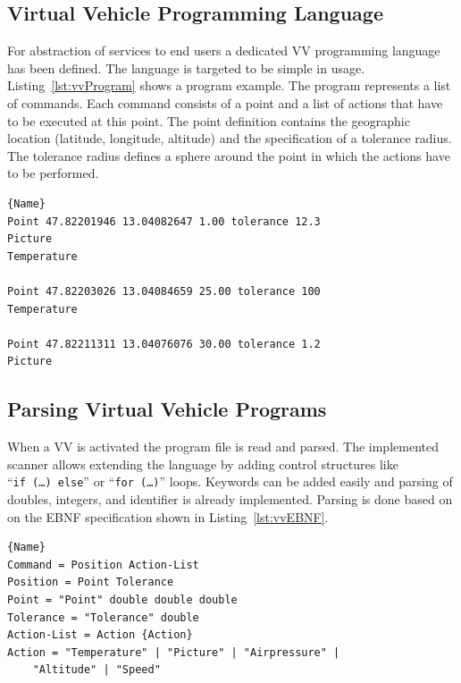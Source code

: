 \subsection{Virtual Vehicle Programming Language}

For abstraction of services to end users a dedicated \ac{VV} programming language has been defined. The language
is targeted to be simple in usage. Listing~\ref{lst:vvProgram} shows a program example. The program represents a
list of commands. Each command consists of a point and a list of actions that have to be executed at this point. The
point definition contains the geographic location (latitude, longitude, altitude) and the specification of a tolerance
radius. The tolerance radius defines a sphere around the point in which the actions have to be performed.

\lstset{tabsize=3,language=Tex}
\begin{lstlisting}[caption={Virtual Vehicle Sample Program},mathescape=true,label=lst:vvProgram]{Name}
Point 47.82201946 13.04082647 1.00 tolerance 12.3
Picture
Temperature

Point 47.82203026 13.04084659 25.00 tolerance 100
Temperature

Point 47.82211311 13.04076076 30.00 tolerance 1.2
Picture
\end{lstlisting}

\subsection{Parsing Virtual Vehicle Programs}
When a \ac{VV} is activated the program file is read and parsed. The implemented scanner allows extending the 
language by adding control structures like ``\texttt{if~(\ldots)~else}'' or ``\texttt{for~(\ldots)}'' loops. Keywords
can be added easily and parsing of doubles, integers, and identifier is already implemented. 
%
Parsing is done based on on the EBNF specification shown in Listing~\ref{lst:vvEBNF}.

\lstset{tabsize=3,language=Tex}
\begin{lstlisting}[caption={Virtual Vehicle EBNF},mathescape=true,label=lst:vvEBNF]{Name}
Command = Position Action-List
Position = Point Tolerance
Point = "Point" double double double
Tolerance = "Tolerance" double
Action-List = Action {Action}
Action = "Temperature" | "Picture" | "Airpressure" |
	"Altitude" | "Speed"
\end{lstlisting}



